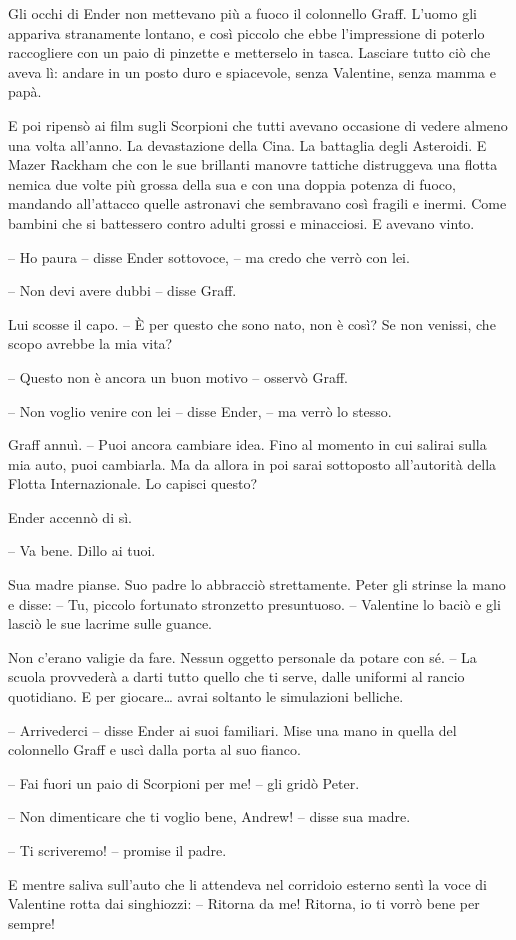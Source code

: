 {Gli occhi di Ender non mettevano più a fuoco il colonnello Graff.
	L'uomo gli appariva stranamente lontano, e così piccolo che ebbe
	l'impressione di poterlo raccogliere con un paio di pinzette e
	metterselo in tasca. Lasciare tutto ciò che aveva lì: andare in un posto
	duro e spiacevole, senza Valentine, senza mamma e papà.}

{E poi ripensò ai film sugli Scorpioni che tutti avevano occasione di
	vedere almeno una volta all'anno. La devastazione della Cina. La
	battaglia degli Asteroidi. E Mazer Rackham che con le sue brillanti
	manovre tattiche distruggeva una flotta nemica due volte più grossa
	della sua e con una doppia potenza di fuoco, mandando all'attacco quelle
	astronavi che sembravano così fragili e inermi. Come bambini che si
	battessero contro adulti grossi e minacciosi. E avevano vinto.}

{-- Ho paura -- disse Ender sottovoce, -- ma credo che verrò con lei.}

{-- Non devi avere dubbi -- disse Graff.}

{Lui scosse il capo. -- È per questo che sono nato, non è così? Se non
	venissi, che scopo avrebbe la mia vita?}

{-- Questo non è ancora un buon motivo -- osservò Graff.}

{-- Non voglio venire con lei -- disse Ender, -- ma verrò lo stesso.}

{Graff annuì. -- Puoi ancora cambiare idea. Fino al momento in cui
	salirai sulla mia auto, puoi cambiarla. Ma da allora in poi sarai
	sottoposto all'autorità della Flotta Internazionale. Lo capisci questo?}

{Ender accennò di sì.}

{-- Va bene. Dillo ai tuoi.}

{Sua madre pianse. Suo padre lo abbracciò strettamente. Peter gli
	strinse la mano e disse: -- Tu, piccolo fortunato stronzetto
	presuntuoso. -- Valentine lo baciò e gli lasciò le sue lacrime sulle
	guance.}

{Non c'erano valigie da fare. Nessun oggetto personale da potare con sé.
	-- La scuola provvederà a darti tutto quello che ti serve, dalle
	uniformi al rancio quotidiano. E per giocare\ldots{} avrai soltanto le
	simulazioni belliche.}

{-- Arrivederci -- disse Ender ai suoi familiari. Mise una mano in
	quella del colonnello Graff e uscì dalla porta al suo fianco.}

{-- Fai fuori un paio di Scorpioni per me! -- gli gridò Peter.}

{-- Non dimenticare che ti voglio bene, Andrew! -- disse sua madre.}

{-- Ti scriveremo! -- promise il padre.}

{E mentre saliva sull'auto che li attendeva nel corridoio esterno sentì
	la voce di Valentine rotta dai singhiozzi: -- Ritorna da me! Ritorna, io
	ti vorrò bene per sempre!}

\label{Orsonux20Scottux20Cardux20-ux20Ilux20Giocoux20Diux20Enderux20-ux20BY_SLY70A1_split_006.htm}{}
